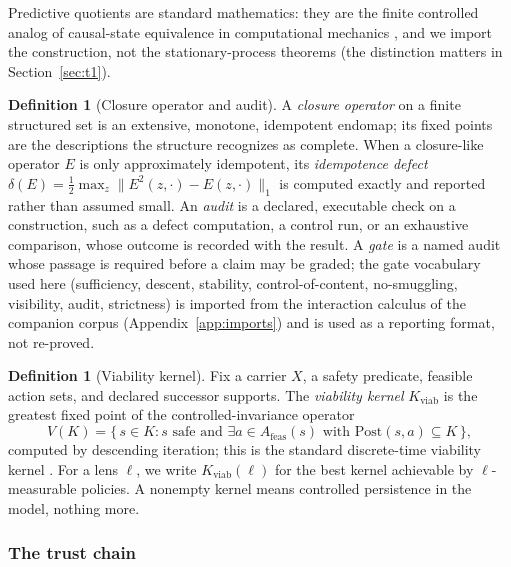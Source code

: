 \documentclass[11pt]{article}
\newcommand{\Kviab}{K_{\mathrm{viab}}}
\theoremstyle{definition}
\newtheorem{definition}[theorem]{Definition}
\begin{document}
Predictive quotients are standard mathematics: they are the finite controlled
analog of causal-state equivalence in computational mechanics
\citep{CrutchfieldYoung1989, ShaliziCrutchfield2001}, and we import the
construction, not the stationary-process theorems (the distinction matters in
Section~\ref{sec:t1}).

\begin{definition}[Closure operator and audit]
A \emph{closure operator} on a finite structured set is an extensive, monotone,
idempotent endomap; its fixed points are the descriptions the structure
recognizes as complete. When a closure-like operator $E$ is only approximately
idempotent, its \emph{idempotence defect} $\delta(E)=\tfrac12\max_z
\lVert E^2(z,\cdot)-E(z,\cdot)\rVert_1$ is computed exactly and reported rather
than assumed small. An \emph{audit} is a declared, executable check on a
construction, such as a defect computation, a control run, or an exhaustive
comparison, whose outcome is recorded with the result. A \emph{gate} is a named audit
whose passage is required before a claim may be graded; the gate vocabulary
used here (sufficiency, descent, stability, control-of-content, no-smuggling,
visibility, audit, strictness) is imported from the interaction calculus of
the companion corpus (Appendix~\ref{app:imports}) and is used as a reporting
format, not re-proved.
\end{definition}

\begin{definition}[Viability kernel]
Fix a carrier $X$, a safety predicate, feasible action sets, and declared
successor supports. The \emph{viability kernel} $\Kviab$ is the greatest fixed
point of the controlled-invariance operator
\[
V(K) = \{\, s \in K : s \text{ safe and } \exists a \in A_{\mathrm{feas}}(s)
\text{ with } \mathrm{Post}(s,a) \subseteq K \,\},
\]
computed by descending iteration; this is the standard discrete-time viability
kernel \citep{AnayaEtAl2009Viability, AubinBayenSaintPierre2011}. For a lens
$\ell$, we write $\Kviab(\ell)$ for the best kernel achievable by
$\ell$-measurable policies. A nonempty kernel means controlled persistence in
the model, nothing more.
\end{definition}

\subsubsection*{The trust chain}
\end{document}
